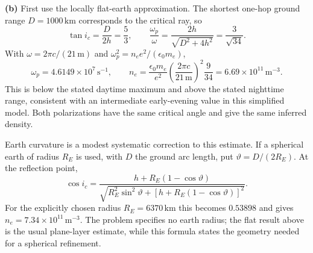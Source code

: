\textbf{(b)} First use the locally flat-earth approximation. The
shortest one-hop ground range $D=1000\,\mathrm{km}$ corresponds
to the critical ray, so
\[
\tan i_c=\frac{D}{2h}=\frac53,\qquad
\frac{\omega_p}{\omega}=\frac{2h}{\sqrt{D^2+4h^2}}
=\frac3{\sqrt{34}}.
\]
With $\omega=2\pi c/(21\,\mathrm m)$ and
$\omega_p^2=n_e e^2/(\epsilon_0m_e)$,
\[
\boxed{\omega_p=4.6149\times10^7\,\mathrm{s}^{-1},\qquad
n_e=\frac{\epsilon_0m_e}{e^2}
\left(\frac{2\pi c}{21\,\mathrm m}\right)^2\frac9{34}
=6.69\times10^{11}\,\mathrm{m}^{-3}.}
\]
This is below the stated daytime maximum and above the stated
nighttime range, consistent with an intermediate early-evening
value in this simplified model. Both polarizations have the same
critical angle and give the same inferred density.

Earth curvature is a modest systematic correction to this estimate.
If a spherical earth of radius $R_E$ is used, with $D$ the ground
arc length, put $\vartheta=D/(2R_E)$. At the reflection point,
\[
\cos i_c=\frac{h+R_E(1-\cos\vartheta)}
{\sqrt{R_E^2\sin^2\vartheta+[h+R_E(1-\cos\vartheta)]^2}}.
\]
For the explicitly chosen radius $R_E=6370\,\mathrm{km}$ this
becomes $0.53898$ and gives $n_e=7.34\times10^{11}\,\mathrm{m}^{-3}$.
The problem specifies no earth radius; the flat result above is the
usual plane-layer estimate, while this formula states the geometry
needed for a spherical refinement.

